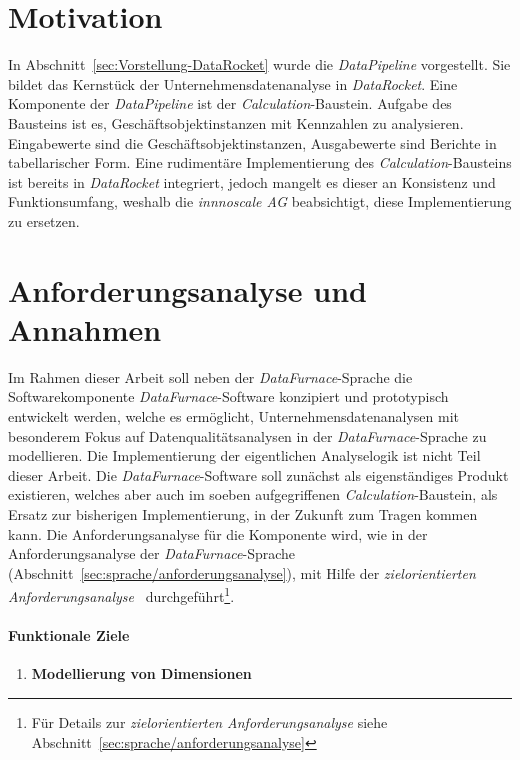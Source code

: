\documentclass[
  language=german, %
  type=bachelor,%
  ngerman
]{isthesis}
\begin{document}
\begin{content}
  \section{Motivation}
  In Abschnitt~\ref{sec:Vorstellung-DataRocket} wurde die \textit{DataPipeline}
  vorgestellt. Sie bildet das Kernstück der Unternehmensdatenanalyse in
  \textit{DataRocket}. Eine Komponente der \textit{DataPipeline} ist der
  \textit{Calculation}-Baustein.  Aufgabe des Bausteins ist es,
  Geschäftsobjektinstanzen mit Kennzahlen zu analysieren. Eingabewerte sind die
  Geschäftsobjektinstanzen, Ausgabewerte sind Berichte in tabellarischer Form.
  Eine rudimentäre Implementierung des \textit{Calculation}-Bausteins ist
  bereits in \textit{DataRocket} integriert, jedoch mangelt es dieser an
  Konsistenz und Funktionsumfang, weshalb die \textit{innnoscale AG}
  beabsichtigt, diese Implementierung zu ersetzen.

  \section{Anforderungsanalyse und Annahmen}\label{sec:software/anforderungsanalyse}

	Im Rahmen dieser Arbeit soll neben der \textit{DataFurnace}-Sprache die
	Softwarekomponente \textit{DataFurnace}-Software konzipiert und
	prototypisch entwickelt werden, welche es ermöglicht,
	Unternehmensdatenanalysen mit besonderem Fokus auf Datenqualitätsanalysen
	in der \textit{DataFurnace}-Sprache zu modellieren. Die Implementierung der
	eigentlichen Analyselogik ist nicht Teil dieser Arbeit.  Die
	\textit{DataFurnace}-Software soll zunächst als eigenständiges Produkt
	existieren, welches aber auch im soeben aufgegriffenen
	\textit{Calculation}-Baustein, als Ersatz zur bisherigen Implementierung, in
	der Zukunft zum Tragen kommen kann. Die Anforderungsanalyse für die
	Komponente wird, wie in der Anforderungsanalyse der
	\textit{DataFurnace}-Sprache
	(Abschnitt~\ref{sec:sprache/anforderungsanalyse}), mit Hilfe der
	\textit{zielorientierten Anforderungsanalyse}~\cite[][]{van2001goal}
	durchgeführt\footnote{Für Details zur \textit{zielorientierten
	Anforderungsanalyse} siehe Abschnitt~\ref{sec:sprache/anforderungsanalyse}}. 


  \paragraph{Funktionale Ziele}
  \begin{enumerate}
    \item \textbf{Modellierung von Dimensionen}


\end{enumerate}
\end{content}
\end{document}
